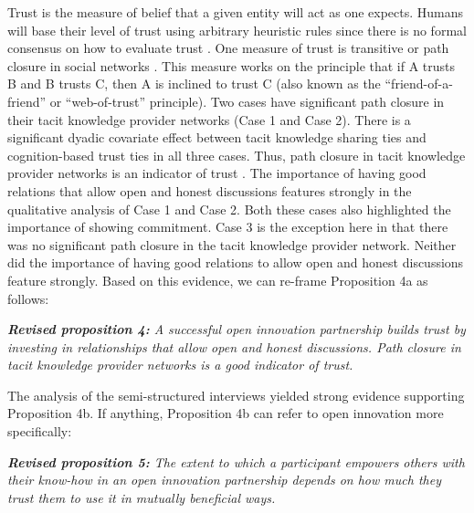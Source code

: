 Trust is the measure of belief that a given entity will act as one expects. Humans will base their level of trust using arbitrary heuristic rules since there is no formal consensus on how to evaluate trust \citep{richters2011trust}. One measure of trust is transitive or path closure in social networks \citep{coleman1988social,burt2001structural}. This measure works on the principle that if A trusts B and B trusts C, then A is inclined to trust C (also known as the \enquote{friend-of-a-friend} or \enquote{web-of-trust} principle). Two cases have significant path closure in their tacit knowledge provider networks (Case 1 and Case 2). There is a significant dyadic covariate effect between tacit knowledge sharing ties and cognition-based trust ties in all three cases. Thus, path closure in tacit knowledge provider networks is an indicator of trust \citep{sherchan2013survey}. The importance of having good relations that allow open and honest discussions features strongly in the qualitative analysis of Case 1 and Case 2. Both these cases also highlighted the importance of showing commitment. Case 3 is the exception here in that there was no significant path closure in the tacit knowledge provider network. Neither did the importance of having good relations to allow open and honest discussions feature strongly. Based on this evidence, we can re-frame Proposition 4a as follows: \bigskip

\begin{tcolorbox}
\textit{\textbf{Revised proposition 4:} A successful open innovation partnership builds trust by investing in relationships that allow open and honest discussions. Path closure in tacit knowledge provider networks is a good indicator of trust.}
\end{tcolorbox}

The analysis of the semi-structured interviews yielded strong evidence supporting Proposition 4b. If anything, Proposition 4b can refer to open innovation more specifically: \bigskip

\begin{tcolorbox}
\textit{\textbf{Revised proposition 5:} The extent to which a participant empowers others with their know-how in an open innovation partnership depends on how much they trust them to use it in mutually beneficial ways.}
\end{tcolorbox}

